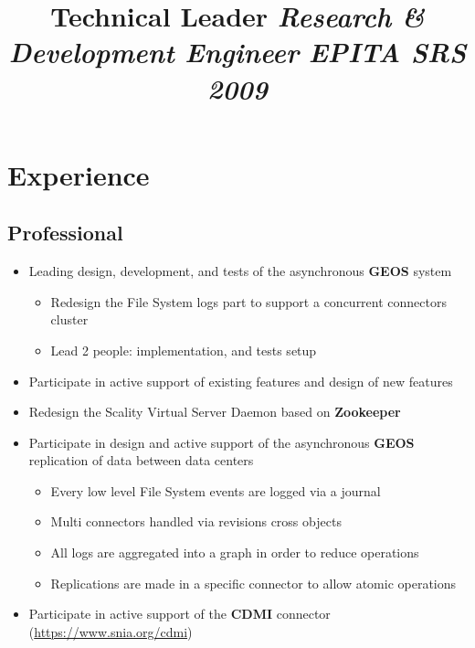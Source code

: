 \documentclass[11pt, a4paper]{moderncv}
\title{\textbf{Technical Leader}
       \newline \Large{\textit{Research \& Development Engineer}}
       \newline \large{\textit{EPITA SRS 2009}}}
\begin{document}
\maketitle

\section{Experience}
\subsection{Professional}
{
  \begin{itemize}
    \renewcommand{\labelitemi}{$\bullet$  }
    \item Leading design, development, and tests of the asynchronous \textbf{GEOS} system
      \begin{itemize}
        \item Redesign the File System logs part to support a concurrent connectors cluster
        \item Lead 2 people: implementation, and tests setup
      \end{itemize}
  \end{itemize}
}
{
  \begin{itemize}
    \renewcommand{\labelitemi}{$\bullet$  }
    \item Participate in active support of existing features and design of new features
    \item Redesign the Scality Virtual Server Daemon based on \textbf{Zookeeper} 
    \item Participate in design and active support of the asynchronous \textbf{GEOS}
      replication of data between data centers
      \begin{itemize}
        \item Every low level File System events are logged via a journal
        \item Multi connectors handled via revisions cross objects
        \item All logs are aggregated into a graph in order to reduce operations
        \item Replications are made in a specific connector to allow atomic operations
      \end{itemize}
    \item Participate in active support of the \textbf{CDMI} connector (\url{https://www.snia.org/cdmi})
  \end{itemize}
}
\end{document}
